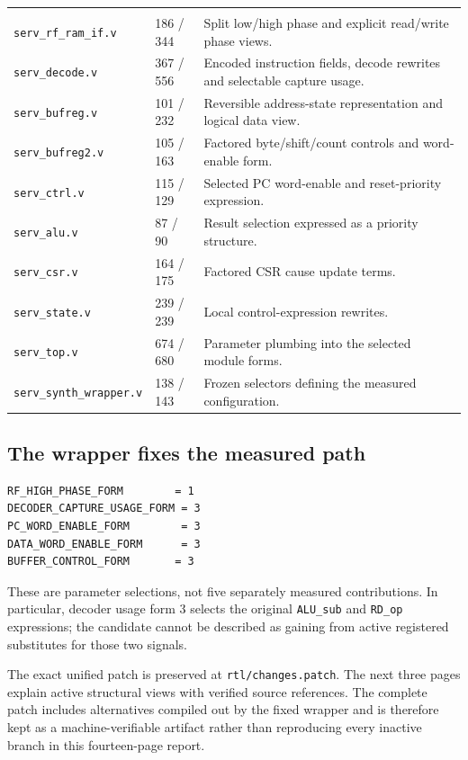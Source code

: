 {\small{}
\begin{tabularx}{\textwidth}{@{}P{38mm}P{21mm}Y@{}}
 &  &  \\
\texttt{serv\_rf\_ram\_if.v} & 186 / 344 & Split low/high phase and explicit read/write phase views. \\
\texttt{serv\_decode.v} & 367 / 556 & Encoded instruction fields, decode rewrites and selectable capture usage. \\
\texttt{serv\_bufreg.v} & 101 / 232 & Reversible address-state representation and logical data view. \\
\texttt{serv\_bufreg2.v} & 105 / 163 & Factored byte/shift/count controls and word-enable form. \\
\texttt{serv\_ctrl.v} & 115 / 129 & Selected PC word-enable and reset-priority expression. \\
\texttt{serv\_alu.v} & 87 / 90 & Result selection expressed as a priority structure. \\
\texttt{serv\_csr.v} & 164 / 175 & Factored CSR cause update terms. \\
\texttt{serv\_state.v} & 239 / 239 & Local control-expression rewrites. \\
\texttt{serv\_top.v} & 674 / 680 & Parameter plumbing into the selected module forms. \\
\texttt{serv\_synth\_wrapper.v} & 138 / 143 & Frozen selectors defining the measured configuration. \\
\end{tabularx}
}
\par
\subsection{The wrapper fixes the measured path}
\begin{lstlisting}[language=VerilogDiff]
RF_HIGH_PHASE_FORM        = 1
DECODER_CAPTURE_USAGE_FORM = 3
PC_WORD_ENABLE_FORM        = 3
DATA_WORD_ENABLE_FORM      = 3
BUFFER_CONTROL_FORM       = 3
\end{lstlisting}
These are parameter selections, not five separately measured contributions. In particular, decoder usage form 3 selects the original \texttt{ALU\_sub} and \texttt{RD\_op} expressions; the candidate cannot be described as gaining from active registered substitutes for those two signals.

The exact unified patch is preserved at \texttt{rtl/changes.patch}. The next three pages explain active structural views with verified source references. The complete patch includes alternatives compiled out by the fixed wrapper and is therefore kept as a machine-verifiable artifact rather than reproducing every inactive branch in this fourteen-page report.

